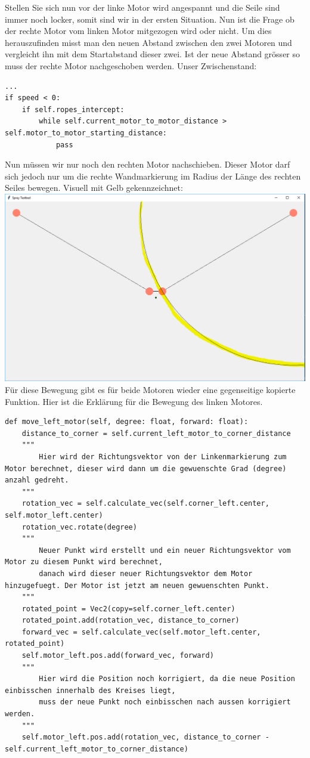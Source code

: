 \documentclass[12pt]{article}
\begin{document}
Stellen Sie sich nun vor der linke Motor wird angespannt und die Seile sind immer noch locker, somit sind wir in der ersten Situation.
Nun ist die Frage ob der rechte Motor vom linken Motor mitgezogen wird oder nicht. Um dies herauszufinden misst man den neuen Abstand zwischen den zwei Motoren und vergleicht ihn mit dem Startabstand dieser zwei. Ist der neue Abstand grösser so muss der rechte Motor nachgeschoben werden. Unser Zwischenstand:
\begin{lstlisting}
...
if speed < 0:
	if self.ropes_intercept:
		while self.current_motor_to_motor_distance > self.motor_to_motor_starting_distance:
			pass
\end{lstlisting}
Nun müssen wir nur noch den rechten Motor nachschieben. Dieser Motor darf sich jedoch nur um die rechte Wandmarkierung im Radius der Länge des rechten Seiles bewegen. Visuell mit Gelb gekennzeichnet:\newline
\includegraphics[width=1\textwidth]{motor_wanderlinie.PNG}
Für diese Bewegung gibt es für beide Motoren wieder eine gegenseitige kopierte Funktion. Hier ist die Erklärung für die Bewegung des linken Motores.
\begin{lstlisting}
def move_left_motor(self, degree: float, forward: float):
	distance_to_corner = self.current_left_motor_to_corner_distance
	"""
		Hier wird der Richtungsvektor von der Linkenmarkierung zum Motor berechnet, dieser wird dann um die gewuenschte Grad (degree) anzahl gedreht.
	"""
	rotation_vec = self.calculate_vec(self.corner_left.center, self.motor_left.center)
	rotation_vec.rotate(degree)
	"""
		Neuer Punkt wird erstellt und ein neuer Richtungsvektor vom Motor zu diesem Punkt wird berechnet,
		danach wird dieser neuer Richtungsvektor dem Motor hinzugefuegt. Der Motor ist jetzt am neuen gewuenschten Punkt.
	"""
	rotated_point = Vec2(copy=self.corner_left.center)
	rotated_point.add(rotation_vec, distance_to_corner)
	forward_vec = self.calculate_vec(self.motor_left.center, rotated_point)
	self.motor_left.pos.add(forward_vec, forward)
	"""
		Hier wird die Position noch korrigiert, da die neue Position einbisschen innerhalb des Kreises liegt,
		muss der neue Punkt noch einbisschen nach aussen korrigiert werden.
	"""
	self.motor_left.pos.add(rotation_vec, distance_to_corner - self.current_left_motor_to_corner_distance)
\end{lstlisting}
\end{document}
